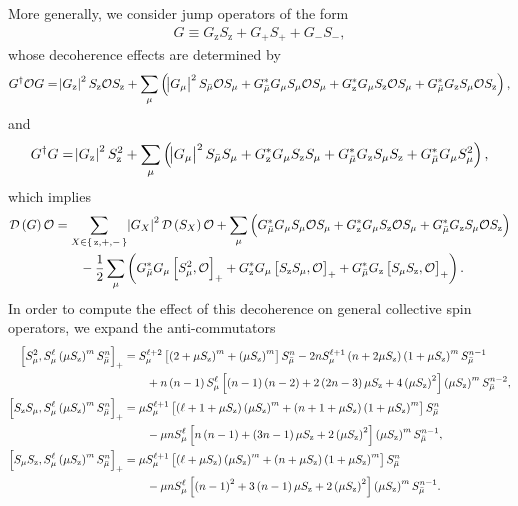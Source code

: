 \documentclass[pra,twocolumn,longbibliography]{revtex4-2}
\newcommand{\f}[2]{\dfrac{#1}{#2}} %
\newcommand{\p}[1]{\left( #1 \right)} %
\renewcommand{\sp}[1]{\left[ #1 \right]} %
\newcommand{\D}{\mathcal{D}}
\renewcommand{\O}{\mathcal{O}}
\newcommand{\z}{\text{z}}
\newcommand{\bmu}{{\bar\mu}}
\newcommand{\1}{\mathds{1}}
\begin{document}
More generally, we consider jump operators of the form
\begin{align}
  G \equiv G_\z S_\z + G_+ S_+ + G_- S_-,
\end{align}
whose decoherence effects are determined by
\begin{align}
  G^\dag \O G
  = \abs{G_\z}^2 S_\z \O S_\z
  + \sum_\mu \p{\abs{G_\mu}^2 S_\bmu \O S_\mu
    + G_\bmu^* G_\mu S_\mu \O S_\mu
    + G_\z^* G_\mu S_\z \O S_\mu
    + G_\bmu^* G_\z S_\mu \O S_\z},
\end{align}
and
\begin{align}
  G^\dag G
  = \abs{G_\z}^2 S_\z^2
  + \sum_\mu \p{\abs{G_\mu}^2 S_\bmu S_\mu
    + G_\z^*G_\mu S_\z S_\mu
    + G_\bmu^* G_\z S_\mu S_\z
    + G_\bmu^* G_\mu S_\mu^2},
\end{align}
which implies
\begin{align}
  \D\p{G} \O
  &= \sum_{X\in\set{\z,+,-}} \abs{G_X}^2 \D\p{S_X} \O
  + \sum_\mu \p{G_\bmu^* G_\mu S_\mu \O S_\mu
    + G_\z^* G_\mu S_\z \O S_\mu
    + G_\bmu^* G_\z S_\mu \O S_\z}
  \notag \\
  &\qquad -\f12 \sum_\mu\p{G_\bmu^* G_\mu \sp{S_\mu^2, \O}_+
    + G_\z^*G_\mu \sp{S_\z S_\mu, \O}_+
    + G_\bmu^* G_\z \sp{S_\mu S_\z, \O}_+}.
\end{align}
In order to compute the effect of this decoherence on general
collective spin operators, we expand the anti-commutators
\begin{align}
  \sp{S_\mu^2, S_\mu^\ell \p{\mu S_\z}^m S_\bmu^n}_+
  &= S_\mu^{\ell+2} \sp{\p{2+\mu S_\z}^m+\p{\mu S_\z}^m} S_\bmu^n
  - 2n S_\mu^{\ell+1} \p{n+2\mu S_\z} \p{1+\mu S_\z}^m S_\bmu^{n-1}
  \notag \\
  &\qquad + n\p{n-1} S_\mu^\ell \sp{\p{n-1}\p{n-2}
    + 2\p{2n-3}\mu S_\z + 4\p{\mu S_\z}^2} \p{\mu S_\z}^m S_\bmu^{n-2},
  \allowdisplaybreaks \\
  \sp{S_\z S_\mu, S_\mu^\ell \p{\mu S_\z}^m S_\bmu^n}_+
  &= \mu S_\mu^{\ell+1} \sp{\p{\ell+1+\mu S_\z}\p{\mu S_\z}^m
    + \p{n+1+\mu S_\z} \p{1+\mu S_\z}^m } S_\bmu^n \notag \\
  &\qquad - \mu n S_\mu^\ell \sp{n \p{n-1}
    + \p{3n-1}\mu S_\z + 2\p{\mu S_\z}^2} \p{\mu S_\z}^m S_\bmu^{n-1},
  \allowdisplaybreaks \\
  \sp{S_\mu S_\z, S_\mu^\ell \p{\mu S_\z}^m S_\bmu^n}_+
  &= \mu S_\mu^{\ell+1} \sp{\p{\ell+\mu S_\z}\p{\mu S_\z}^m
    + \p{n+\mu S_\z} \p{1+\mu S_\z}^m} S_\bmu^n \notag \\
  &\qquad - \mu n S_\mu^\ell \sp{\p{n-1}^2
    + 3\p{n-1}\mu S_\z + 2\p{\mu S_\z}^2} \p{\mu S_\z}^m S_\bmu^{n-1}.
\end{align}
\end{document}

